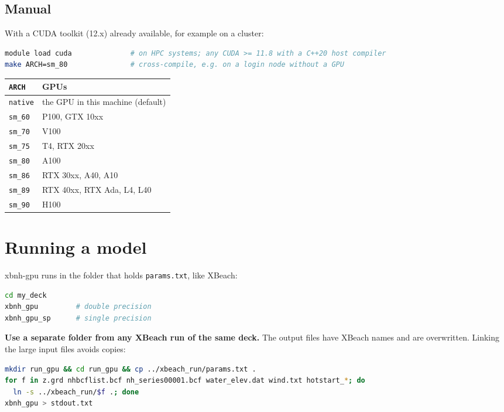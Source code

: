 \documentclass[11pt,a4paper]{article}
\newcommand{\code}[1]{\texttt{#1}}
\begin{document}
\subsection{Manual}
With a CUDA toolkit (12.x) already available, for example on a cluster:
\begin{lstlisting}[language=bash]
module load cuda              # on HPC systems; any CUDA >= 11.8 with a C++20 host compiler
make ARCH=sm_80               # cross-compile, e.g. on a login node without a GPU
\end{lstlisting}
\begin{center}\small
\begin{tabular}{ll}
\toprule
\code{ARCH} & GPUs \\
\midrule
\code{native} & the GPU in this machine (default) \\
\code{sm\_60} & P100, GTX 10xx \\
\code{sm\_70} & V100 \\
\code{sm\_75} & T4, RTX 20xx \\
\code{sm\_80} & A100 \\
\code{sm\_86} & RTX 30xx, A40, A10 \\
\code{sm\_89} & RTX 40xx, RTX Ada, L4, L40 \\
\code{sm\_90} & H100 \\
\bottomrule
\end{tabular}
\end{center}

\section{Running a model}

xbnh-gpu runs in the folder that holds \code{params.txt}, like XBeach:
\begin{lstlisting}[language=bash]
cd my_deck
xbnh_gpu         # double precision
xbnh_gpu_sp      # single precision
\end{lstlisting}
\textbf{Use a separate folder from any XBeach run of the same deck.} The output files have XBeach names
and are overwritten. Linking the large input files avoids copies:
\begin{lstlisting}[language=bash]
mkdir run_gpu && cd run_gpu && cp ../xbeach_run/params.txt .
for f in z.grd nhbcflist.bcf nh_series00001.bcf water_elev.dat wind.txt hotstart_*; do
  ln -s ../xbeach_run/$f .; done
xbnh_gpu > stdout.txt
\end{lstlisting}
\end{document}

